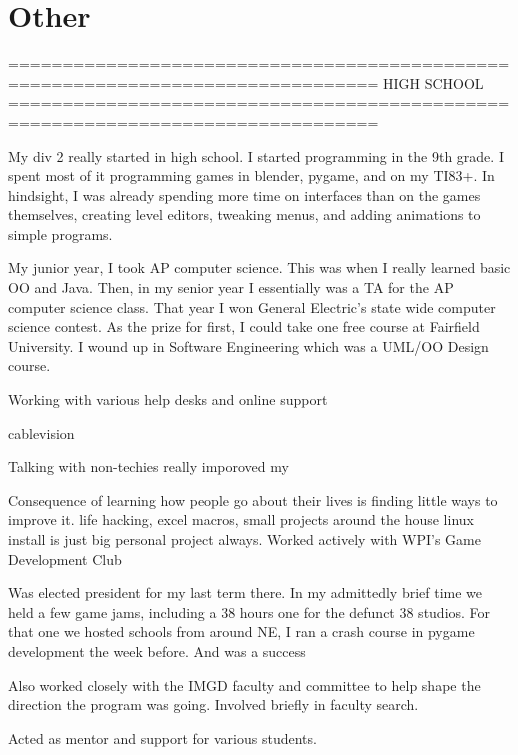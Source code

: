 \chapter{Other}



================================================================================
    HIGH SCHOOL
================================================================================

My div 2 really started in high school. I started programming in the 9th
grade. I spent most of it programming games in blender, pygame, and on
my TI83+. In hindsight, I was already spending more time on interfaces
than on the games themselves, creating level editors, tweaking menus,
and adding animations to simple programs.

My junior year, I took AP computer science. This was when I really
learned basic OO and Java. Then, in my senior year I essentially was a
TA for the AP computer science class. That year I won General Electric's
state wide computer science contest. As the prize for first, I could
take one free course at Fairfield University. I wound up in Software
Engineering which was a UML/OO Design course.



% 
% 
% 
% 


Working with various help desks and online support

cablevision


Talking with non-techies really imporoved my 

Consequence of learning how people go about their lives is finding little ways to improve it.  life hacking, excel macros, small projects around the house linux install is just big personal project always.
Worked actively with WPI's Game Development Club




Was elected president for my last term there.  In my admittedly brief time we held a few game jams, including a 38 hours one for the defunct 38 studios.  For that one we hosted schools from around NE, I ran a crash course in pygame development the week before.  And was a success

Also worked closely with the IMGD faculty and committee to help shape the direction the program was going.  Involved briefly in faculty search.

Acted as mentor and support for various students. 
